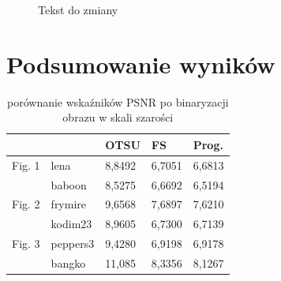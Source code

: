 \begin{figure}[H]
    \caption{Tekst do zmiany} 
    \label{fig:porownanie8}
\end{figure}


\section*{Podsumowanie wyników}


\begin{table}[H]
    \caption{porównanie wskaźników PSNR po binaryzacji obrazu w skali szarości}
    \centering
    \begin{tabular}{lllll}
    \hline
            &           & OTSU   & FS     & Prog.  \\ \hline
    Fig. 1  & lena      & 8,8492 & 6,7051 & 6,6813 \\ 
            & baboon    & 8,5275 & 6,6692 & 6,5194 \\ 
    Fig. 2  & frymire   & 9,6568 & 7,6897 & 7,6210 \\ 
            & kodim23   & 8,9605 & 6,7300 & 6,7139 \\ 
    Fig. 3  & peppers3  & 9,4280 & 6,9198 & 6,9178 \\ 
            & bangko    & 11,085 & 8,3356 & 8,1267 \\ \hline
    \end{tabular}
\end{table}


